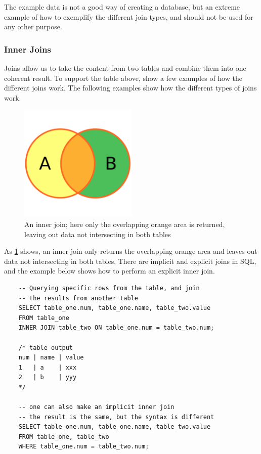 The example data is not a good way of creating a database, but an extreme example of how to exemplify the different join types, and should not be used for any other purpose.

\subsubsection{Inner Joins}
Joins allow us to take the content from two tables and combine them into one coherent result. To support the table above, show a few examples of how the different joins work. The following examples show how the different types of joins work.

\begin{figure}[H]
    \centering
    \includegraphics[width=0.5\textwidth]{content/1-relational-databases/figures/joins/innerjoin.png}
    \caption{An inner join; here only the overlapping orange area is returned, leaving out data not intersecting in both tables}
    \label{fig:1.innerjoin}
\end{figure}

As \cref{fig:1.innerjoin} shows, an inner join only returns the overlapping orange area and leaves out data not intersecting in both tables. There are implicit and explicit joins in SQL, and the example below shows how to perform an explicit inner join.

\begin{verbatim}
    -- Querying specific rows from the table, and join 
    -- the results from another table
    SELECT table_one.num, table_one.name, table_two.value
    FROM table_one
    INNER JOIN table_two ON table_one.num = table_two.num;

    /* table output
    num | name | value
    1   | a    | xxx
    2   | b    | yyy
    */

    -- one can also make an implicit inner join
    -- the result is the same, but the syntax is different
    SELECT table_one.num, table_one.name, table_two.value
    FROM table_one, table_two
    WHERE table_one.num = table_two.num;
\end{verbatim}

